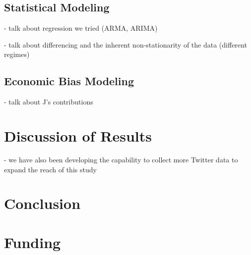 \documentclass[]{interact}
\theoremstyle{plain}%
\theoremstyle{definition}
\theoremstyle{remark}
\begin{document}
    \subsection{Statistical Modeling}
    - talk about regression we tried (ARMA, ARIMA)

    - talk about differencing and the inherent non-stationarity of the data (different regimes)

    \subsection{Economic Bias Modeling}
    - talk about J's contributions

    \section{Discussion of Results}

    - we have also been developing the capability to collect more Twitter data to expand the reach of this study


    \section{Conclusion}

    \section*{Funding}


    \begin{thebibliography}{}


    \end{thebibliography}

    
\end{document}
